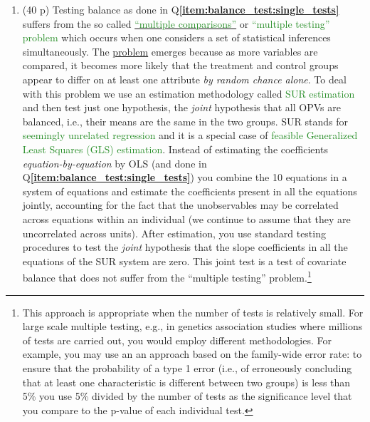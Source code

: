 \documentclass{article}
\begin{document}
\begin{enumerate}[label=\textbf{Q\arabic{enumi}}.,ref=Q\arabic{enumi}, wide=0pt, itemsep=1em, topsep=5pt]
\item (40 p) Testing balance as done in Q\textbf{\ref{item:balance_test:single_tests}} suffers from the so called \href{https://en.wikipedia.org/wiki/Multiple_comparisons_problem}{\textcolor{ForestGreen}{``multiple comparisons''}} or \textcolor{ForestGreen}{``multiple testing'' problem} which occurs when one considers a set of statistical inferences simultaneously. The \href{https://explainxkcd.com/wiki/index.php/882:_Significant}{problem} emerges because as more variables are compared, it becomes more likely that the treatment and control groups appear to differ on at least one attribute \textit{by random chance alone}. To deal
with this problem we use an estimation methodology called \textcolor{ForestGreen}{SUR estimation} and then test just one hypothesis, the \textit{joint} hypothesis that all OPVs are balanced, i.e., their means are the same in the two groups. SUR stands for \textcolor{ForestGreen}{seemingly unrelated regression} and it is a special case of \textcolor{ForestGreen}{feasible Generalized Least Squares (GLS) estimation}. Instead of estimating the coefficients \textit{equation-by-equation} by OLS (and done in Q\textbf{\ref{item:balance_test:single_tests}}) you combine the 10 equations in a system of equations and estimate the coefficients present in all the equations jointly, accounting for the fact that the unobservables may be correlated across equations within an individual (we continue to assume that they are uncorrelated across units). After estimation, you use standard testing procedures to test the \textit{joint} hypothesis that the slope coefficients in all the equations of the SUR system are zero. This joint test is a test of covariate balance that does not suffer from the ``multiple testing'' problem.\footnote{This approach is appropriate when the number of tests is relatively small. For large scale multiple testing, e.g., in genetics association studies where millions of tests are carried out, you would employ different methodologies. For example, you may use an an approach based on the family-wide error rate: to ensure that the probability of a type 1 error (i.e., of erroneously concluding that at least one characteristic is different between two groups) is less than 5\% you use 5\% divided by the number of tests as the significance level that you compare to the p-value of each individual test.}\label{item:balance_test:multiple_tests} 


\end{enumerate}
\end{document}
